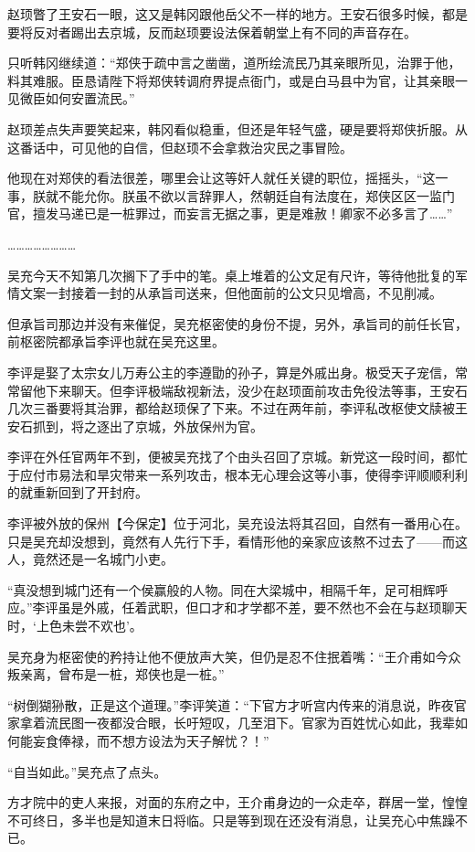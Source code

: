 赵顼瞥了王安石一眼，这又是韩冈跟他岳父不一样的地方。王安石很多时候，都是要将反对者踢出去京城，反而赵顼要设法保着朝堂上有不同的声音存在。

只听韩冈继续道：“郑侠于疏中言之凿凿，道所绘流民乃其亲眼所见，治罪于他，料其难服。臣恳请陛下将郑侠转调府界提点衙门，或是白马县中为官，让其亲眼一见微臣如何安置流民。”

赵顼差点失声要笑起来，韩冈看似稳重，但还是年轻气盛，硬是要将郑侠折服。从这番话中，可见他的自信，但赵顼不会拿救治灾民之事冒险。

他现在对郑侠的看法很差，哪里会让这等奸人就任关键的职位，摇摇头，“这一事，朕就不能允你。朕虽不欲以言辞罪人，然朝廷自有法度在，郑侠区区一监门官，擅发马递已是一桩罪过，而妄言无据之事，更是难赦！卿家不必多言了……”

……………………

吴充今天不知第几次搁下了手中的笔。桌上堆着的公文足有尺许，等待他批复的军情文案一封接着一封的从承旨司送来，但他面前的公文只见增高，不见削减。

但承旨司那边并没有来催促，吴充枢密使的身份不提，另外，承旨司的前任长官，前枢密院都承旨李评也就在吴充这里。

李评是娶了太宗女儿万寿公主的李遵勖的孙子，算是外戚出身。极受天子宠信，常常留他下来聊天。但李评极端敌视新法，没少在赵顼面前攻击免役法等事，王安石几次三番要将其治罪，都给赵顼保了下来。不过在两年前，李评私改枢使文牍被王安石抓到，将之逐出了京城，外放保州为官。

李评在外任官两年不到，便被吴充找了个由头召回了京城。新党这一段时间，都忙于应付市易法和旱灾带来一系列攻击，根本无心理会这等小事，使得李评顺顺利利的就重新回到了开封府。

李评被外放的保州【今保定】位于河北，吴充设法将其召回，自然有一番用心在。只是吴充却没想到，竟然有人先行下手，看情形他的亲家应该熬不过去了——而这人，竟然还是一名城门小吏。

“真没想到城门还有一个侯赢般的人物。同在大梁城中，相隔千年，足可相辉呼应。”李评虽是外戚，任着武职，但口才和才学都不差，要不然也不会在与赵顼聊天时，‘上色未尝不欢也’。

吴充身为枢密使的矜持让他不便放声大笑，但仍是忍不住抿着嘴：“王介甫如今众叛亲离，曾布是一桩，郑侠也是一桩。”

“树倒猢狲散，正是这个道理。”李评笑道：“下官方才听宫内传来的消息说，昨夜官家拿着流民图一夜都没合眼，长吁短叹，几至泪下。官家为百姓忧心如此，我辈如何能妄食俸禄，而不想方设法为天子解忧？！”

“自当如此。”吴充点了点头。

方才院中的吏人来报，对面的东府之中，王介甫身边的一众走卒，群居一堂，惶惶不可终日，多半也是知道末日将临。只是等到现在还没有消息，让吴充心中焦躁不已。

